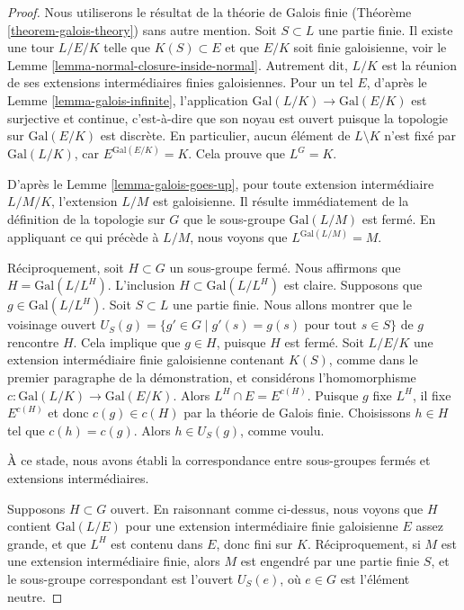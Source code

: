 \begin{proof}
Nous utiliserons le résultat de la théorie de Galois finie
(Théorème \ref{theorem-galois-theory})
sans autre mention.
Soit $S \subset L$ une partie finie. Il existe une tour
$L/E/K$ telle que $K(S) \subset E$ et que
$E/K$ soit finie galoisienne, voir le Lemme \ref{lemma-normal-closure-inside-normal}.
Autrement dit, $L/K$ est la réunion de ses extensions intermédiaires
finies galoisiennes.
Pour un tel $E$, d'après le Lemme \ref{lemma-galois-infinite},
l'application $\text{Gal}(L/K) \to \text{Gal}(E/K)$ est surjective
et continue, c'est-à-dire que son noyau est ouvert puisque la topologie
sur $\text{Gal}(E/K)$ est discrète.
En particulier, aucun élément de $L \setminus K$ n'est fixé par
$\text{Gal}(L/K)$, car $E^{\text{Gal}(E/K)} = K$.
Cela prouve que $L^G = K$.

\medskip\noindent
D'après le Lemme \ref{lemma-galois-goes-up}, pour toute extension intermédiaire $L/M/K$,
l'extension $L/M$ est galoisienne. Il résulte immédiatement de la définition
de la topologie sur $G$ que le sous-groupe $\text{Gal}(L/M)$ est fermé.
En appliquant ce qui précède à $L/M$, nous voyons que $L^{\text{Gal}(L/M)} = M$.

\medskip\noindent
Réciproquement, soit $H \subset G$ un sous-groupe fermé. Nous affirmons que
$H = \text{Gal}(L/L^H)$. L'inclusion $H \subset \text{Gal}(L/L^H)$
est claire. Supposons que $g \in \text{Gal}(L/L^H)$. Soit $S \subset L$
une partie finie. Nous allons montrer que le voisinage ouvert
$U_S(g) = \{g' \in G \mid g'(s) = g(s)\text{ pour tout }s \in S\}$ de $g$ rencontre $H$.
Cela implique que $g \in H$, puisque $H$ est fermé.
Soit $L/E/K$ une extension intermédiaire finie galoisienne contenant $K(S)$,
comme dans le premier paragraphe de la démonstration, et considérons l'homomorphisme
$c : \text{Gal}(L/K) \to \text{Gal}(E/K)$.
Alors $L^H \cap E = E^{c(H)}$. Puisque $g$ fixe $L^H$, il fixe
$E^{c(H)}$ et donc $c(g) \in c(H)$ par la théorie de Galois finie.
Choisissons $h \in H$ tel que $c(h) = c(g)$. Alors $h \in U_S(g)$, comme voulu.

\medskip\noindent
À ce stade, nous avons établi la correspondance entre sous-groupes fermés
et extensions intermédiaires.

\medskip\noindent
Supposons $H \subset G$ ouvert. En raisonnant comme ci-dessus, nous voyons que
$H$ contient $\text{Gal}(L/E)$ pour une extension intermédiaire finie
galoisienne $E$ assez grande, et que $L^H$ est contenu
dans $E$, donc fini sur $K$. Réciproquement, si $M$ est une extension
intermédiaire finie, alors $M$ est engendré par une partie finie $S$,
et le sous-groupe correspondant est l'ouvert $U_S(e)$,
où $e \in G$ est l'élément neutre.


\end{proof}
